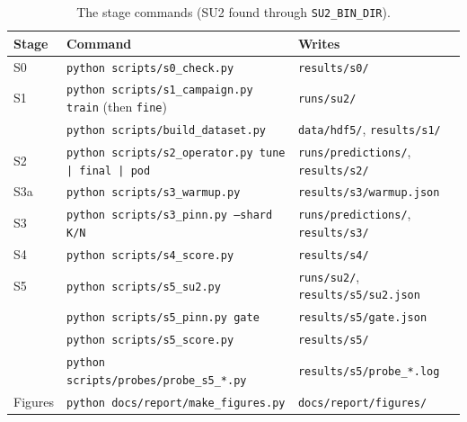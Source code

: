 \documentclass[11pt]{article}
\newcommand{\cmd}[1]{\texttt{\small #1}}
\begin{document}
\begin{table}[h]
\centering\small
\caption{The stage commands (SU2 found through \texttt{SU2\_BIN\_DIR}).}
\label{tab:repro}
\begin{tabular}{@{}lll@{}}
\toprule
Stage & Command & Writes\\
\midrule
S0 & \cmd{python scripts/s0\_check.py} & \cmd{results/s0/}\\
S1 & \cmd{python scripts/s1\_campaign.py train} (then \cmd{fine}) & \cmd{runs/su2/}\\
 & \cmd{python scripts/build\_dataset.py} & \cmd{data/hdf5/}, \cmd{results/s1/}\\
S2 & \cmd{python scripts/s2\_operator.py tune | final | pod} & \cmd{runs/predictions/}, \cmd{results/s2/}\\
S3a & \cmd{python scripts/s3\_warmup.py} & \cmd{results/s3/warmup.json}\\
S3 & \cmd{python scripts/s3\_pinn.py --shard K/N} & \cmd{runs/predictions/}, \cmd{results/s3/}\\
S4 & \cmd{python scripts/s4\_score.py} & \cmd{results/s4/}\\
S5 & \cmd{python scripts/s5\_su2.py} & \cmd{runs/su2/}, \cmd{results/s5/su2.json}\\
 & \cmd{python scripts/s5\_pinn.py gate} & \cmd{results/s5/gate.json}\\
 & \cmd{python scripts/s5\_score.py} & \cmd{results/s5/}\\
 & \cmd{python scripts/probes/probe\_s5\_*.py} & \cmd{results/s5/probe\_*.log}\\
Figures & \cmd{python docs/report/make\_figures.py} & \cmd{docs/report/figures/}\\
\bottomrule
\end{tabular}
\end{table}

\appendix

\end{document}

